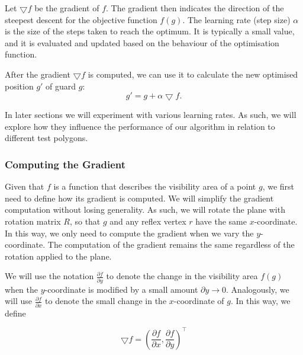 Let $\bigtriangledown f$ be the gradient of $f$. The gradient then indicates the direction of the steepest descent for the objective function $f(g)$.
The learning rate (step size) $\alpha$ is the size of the steps taken to reach the optimum. It is typically a small value, and it is evaluated and updated based on the behaviour of the optimisation function. 

After the gradient $\bigtriangledown f$ is computed, we can use it to calculate the new optimised position $g'$ of guard $g$: $$g' = g + \alpha\bigtriangledown f.$$


In later sections we will experiment with various learning rates. As such, we will explore how they influence the performance of our algorithm in relation to different test polygons. 

\newpage
\subsubsection{Computing the Gradient}

Given that $f$ is a function that describes the visibility area of a point $g$, we first need to define how its gradient is computed. We will simplify the gradient computation without losing generality. As such, we will rotate the plane with rotation matrix $R$, so that $g$ and any reflex vertex $r$ have the same $x$-coordinate. In this way, we only need to compute the gradient when we vary the $y$-coordinate. The computation of the gradient remains the same regardless of the rotation applied to the plane.


We will use the notation $\frac{\partial f}{\partial y}$ to denote the change in the visibility area $f(g)$ when the $y$-coordinate is modified by a small amount $\partial y \rightarrow 0$. Analogously, we will use $\frac{\partial f}{\partial x}$ to denote the small change in the $x$-coordinate of $g$. In this way, we define 

\begin{equation}
    \bigtriangledown f = \left(\frac{\partial f}{\partial x}, \frac{\partial f}{\partial y}\right)^\intercal \label{eq:gradient}
\end{equation}

